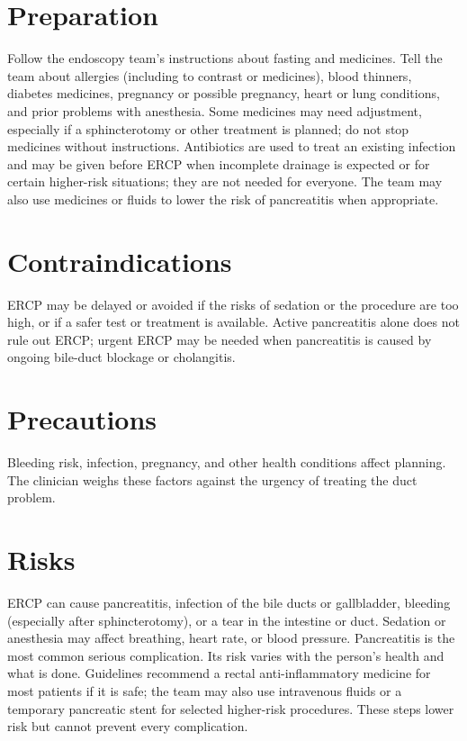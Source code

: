 \section*{Preparation}
Follow the endoscopy team's instructions about fasting and medicines. Tell the team about allergies (including to contrast or medicines), blood thinners, diabetes medicines, pregnancy or possible pregnancy, heart or lung conditions, and prior problems with anesthesia. Some medicines may need adjustment, especially if a sphincterotomy or other treatment is planned; do not stop medicines without instructions. Antibiotics are used to treat an existing infection and may be given before ERCP when incomplete drainage is expected or for certain higher-risk situations; they are not needed for everyone. The team may also use medicines or fluids to lower the risk of pancreatitis when appropriate.

\section*{Contraindications}
ERCP may be delayed or avoided if the risks of sedation or the procedure are too high, or if a safer test or treatment is available. Active pancreatitis alone does not rule out ERCP; urgent ERCP may be needed when pancreatitis is caused by ongoing bile-duct blockage or cholangitis.

\section*{Precautions}
Bleeding risk, infection, pregnancy, and other health conditions affect planning. The clinician weighs these factors against the urgency of treating the duct problem.

\section*{Risks}
ERCP can cause pancreatitis, infection of the bile ducts or gallbladder, bleeding (especially after sphincterotomy), or a tear in the intestine or duct. Sedation or anesthesia may affect breathing, heart rate, or blood pressure. Pancreatitis is the most common serious complication. Its risk varies with the person's health and what is done. Guidelines recommend a rectal anti-inflammatory medicine for most patients if it is safe; the team may also use intravenous fluids or a temporary pancreatic stent for selected higher-risk procedures. These steps lower risk but cannot prevent every complication.

